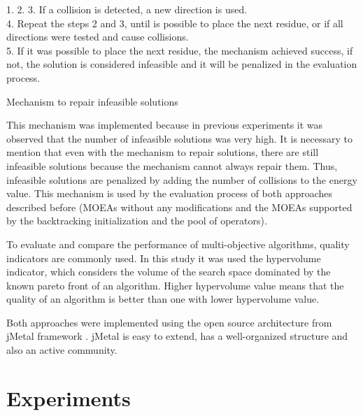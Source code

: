 \begin{algorithm}[h]
	1. %
	2. %
	3. If a collision is detected, a new direction is used.\\
	4. Repeat the steps 2 and 3, until is possible to place the next residue, or if all directions were tested and cause collisions.\\
	5. If it was possible to place the next residue, the mechanism achieved success, if not, the solution is considered infeasible and it will be penalized in the evaluation process.
	\caption{Mechanism to repair infeasible solutions}
	\label{algo:reparacao}
\end{algorithm}


This mechanism was implemented because in previous experiments it was observed that the number of infeasible solutions was very high. It is necessary to mention that even with the mechanism to repair solutions, there are still infeasible solutions because the mechanism cannot always repair them. Thus, infeasible solutions are penalized by adding the number of collisions to the energy value. This mechanism is used by the evaluation process of both approaches described before (MOEAs without any modifications and the MOEAs supported by the backtracking initialization and the pool of operators).

To evaluate and compare the performance of multi-objective algorithms, quality indicators are commonly used. In this study it was used the hypervolume indicator, which considers the volume of the search space dominated by the known pareto front \cite{zitzler2003performance} of an algorithm. Higher hypervolume value means that the quality of an algorithm is better than one with lower hypervolume value.

Both approaches were implemented using the open source architecture from  jMetal framework \cite{durillo2011jmetal}.  jMetal is easy to extend, has a well-organized structure and also an active community. 


\section{Experiments} \label{sec:experiments}


